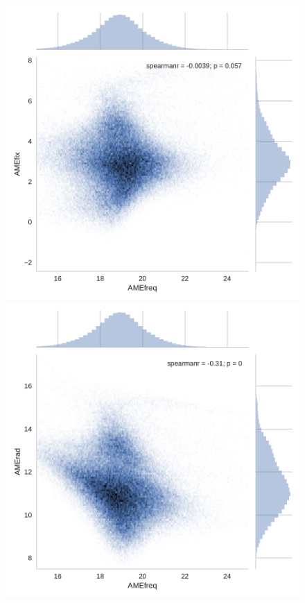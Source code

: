 {       \begin{figure}
         \includegraphics[width=\textwidth/3]{../Plots/ch_allsky/AMEfreq_vs_fix.pdf}
         \includegraphics[width=\textwidth/3]{../Plots/ch_allsky/AMEfreq_vs_rad.pdf}

\end{figure}}
